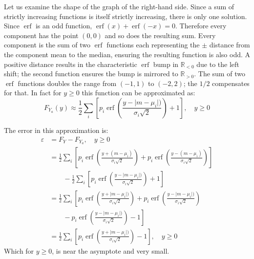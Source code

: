 \documentclass{article}
\DeclareMathOperator\erf{erf}
\begin{document}
Let us examine the shape of the graph of the right-hand side. Since a sum of strictly increasing functions is itself strictly increasing, there is only one solution. Since $\erf$ is an odd function, $\erf(x) + \erf(-x) = 0$. Therefore every component has the point $(0,0)$ and so does the resulting sum. Every component is the sum of two $\erf$ functions each representing the $\pm$ distance from the component mean to the median, ensuring the resulting function is also odd. A positive distance results in the characteristic $\erf$ bump in $\mathbb{R}_{<0}$ due to the left shift; the second function ensures the bump is mirrored to $\mathbb{R}_{>0}$. The sum of two $\erf$ functions doubles the range from $(-1,1)$ to $(-2,2)$; the $1/2$ compensates for that. In fact for $y \geq 0$ this function can be approximated as:
%
\begin{equation}\label{Normal Mixture MAD Approximation}
F_{Y_a}(y) \approx \frac{1}{2} \sum_i \left[ p_i \erf
    \left( \frac{y - \lvert m - \mu_i \rvert)}{\sigma_i\sqrt{2}} \right)
    + 1 \right]
,   \quad y \geq 0
\end{equation}

The error in this approximation is:
%
\begin{equation}\label{Normal Mixture MAD Approximation Error}
\begin{split}
\varepsilon &= F_Y - F_{Y_a}
,   \quad y \geq 0 \\
& = \frac{1}{2} \sum_i \left[
    p_i \erf \left( \frac{y + (m - \mu_i)}{\sigma_i\sqrt{2}} \right)
+   p_i \erf \left( \frac{y - (m - \mu_i)}{\sigma_i\sqrt{2}} \right)
    \right] \\
&   \qquad - \frac{1}{2} \sum_i \left[ p_i \erf
    \left( \frac{y - \lvert m - \mu_i \rvert)}{\sigma_i\sqrt{2}} \right)
    + 1 \right] \\
& = \frac{1}{2} \sum_i \left[
    p_i \erf \left( \frac{y + \lvert m - \mu_i \rvert)}{\sigma_i\sqrt{2}} \right)
+   p_i \erf \left( \frac{y - \lvert m - \mu_i \rvert)}{\sigma_i\sqrt{2}} \right)
    \right. \\
&   \left. \qquad -
    p_i \erf \left( \frac{y - \lvert m - \mu_i \rvert)}{\sigma_i\sqrt{2}} \right)
    - 1 \right] \\
& = \frac{1}{2} \sum_i \left[
    p_i \erf \left( \frac{y + \lvert m - \mu_i \rvert)}{\sigma_i\sqrt{2}} \right)
    - 1 \right]
,   \quad y \geq 0
\end{split}
\end{equation}
%
Which for $y \geq 0 $, is near the asymptote and very small.
\end{document}
